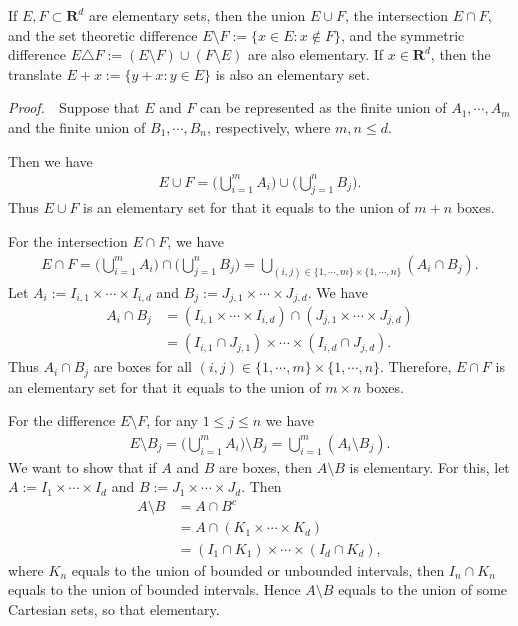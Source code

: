 \documentclass{book}
\theoremstyle{defstyle}
\theoremstyle{thmstyle}
\newcommand{\pff}{\noindent\emph{Proof.}~~}
\begin{document}
\begin{proposition}\label{thm:boolean closure}
    If $E, F \subset \mathbf{R}^d$ are elementary sets, then the union $E \cup F$, the intersection $E \cap F$, and the set theoretic difference $E \setminus F := \{x \in E : x \notin F\}$, and the symmetric difference $E\triangle F := (E \setminus F) \cup (F \setminus E)$ are also elementary. If $x \in \mathbf{R}^d$, then the translate $E + x := \{y + x : y \in E\}$ is also an elementary set.
\end{proposition}

\pff Suppose that $E$ and $F$ can be represented as the finite union of $A_1, \cdots, A_m$ and the finite union of $B_1, \cdots, B_n$, respectively, where $m, n \leq d$.

Then we have
    \begin{align*}
        E \cup F
        = \Big(\bigcup_{i = 1}^{m} A_i\Big) \cup \Big(\bigcup_{j = 1}^{n} B_j\Big).
    \end{align*}
Thus $E \cup F$ is an elementary set for that it equals to the union of $m + n$ boxes.

For the intersection $E \cap F$, we have
    \begin{align*}
        E \cap F
        = \Big(\bigcup_{i = 1}^{m} A_i\Big) \cap \Big(\bigcup_{j = 1}^{n} B_j\Big)
        = \bigcup_{(i, j) \in \{1, \cdots, m\} \times \{1, \cdots, n\}} (A_i \cap B_j).
    \end{align*}
Let $A_i := I_{i, 1} \times \cdots \times I_{i, d}$ and $B_j := J_{j, 1} \times \cdots \times J_{j, d}$. We have
    \begin{align*}
        A_i \cap B_j
        &= (I_{i, 1} \times \cdots \times I_{i, d}) \cap (J_{j, 1} \times \cdots \times J_{j, d})\\
        &= (I_{i, 1} \cap J_{j, 1}) \times \cdots \times (I_{i, d} \cap J_{j, d}).
    \end{align*}
Thus $A_i \cap B_j$ are boxes for all $(i, j) \in \{1, \cdots, m\} \times \{1, \cdots, n\}$. Therefore, $E \cap F$ is an elementary set for that it equals to the union of $m \times n$ boxes.

For the difference $E \setminus F$, for any $1 \leq j \leq n$ we have
    \begin{align*}
        E \setminus B_j = \Big(\bigcup_{i = 1}^{m} A_i\Big) \setminus B_j
        = \bigcup_{i = 1}^{m} (A_i \setminus B_j).
    \end{align*}
We want to show that if $A$ and $B$ are boxes, then $A \setminus B$ is elementary. For this, let $A := I_1 \times \cdots \times I_d$ and $B := J_1 \times \cdots \times J_d$. Then
    \begin{align*}
        A \setminus B &= A \cap B^c\\
        &= A \cap (K_1 \times \cdots \times K_d)\\
        &= (I_1 \cap K_1) \times \cdots \times (I_d \cap K_d),
    \end{align*}
where $K_n$ equals to the union of bounded or unbounded intervals, then $I_n \cap K_n$ equals to the union of bounded intervals. Hence $A \setminus B$ equals to the union of some Cartesian sets, so that elementary.
\end{document}
